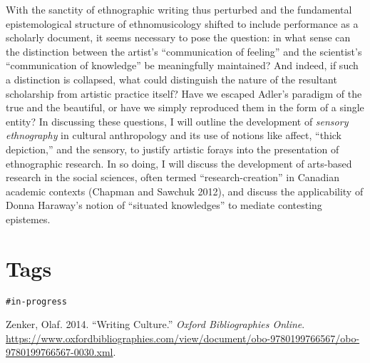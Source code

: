 With the sanctity of ethnographic writing thus perturbed and the
fundamental epistemological structure of ethnomusicology shifted to
include performance as a scholarly document, it seems necessary to pose
the question: in what sense can the distinction between the artist's
``communication of feeling'' and the scientist's ``communication of
knowledge'' be meaningfully maintained? And indeed, if such a
distinction is collapsed, what could distinguish the nature of the
resultant scholarship from artistic practice itself? Have we escaped
Adler's paradigm of the true and the beautiful, or have we simply
reproduced them in the form of a single entity? In discussing these
questions, I will outline the development of \emph{sensory ethnography}
in cultural anthropology and its use of notions like affect, ``thick
depiction,'' and the sensory, to justify artistic forays into the
presentation of ethnographic research. In so doing, I will discuss the
development of arts-based research in the social sciences, often termed
``research-creation'' in Canadian academic contexts (Chapman and Sawchuk
2012), and discuss the applicability of Donna Haraway's notion of
``situated knowledges'' to mediate contesting epistemes.

\hypertarget{tags}{%
\section{Tags}\label{tags}}

\texttt{\#in-progress}

\hypertarget{refs}{}
\begin{cslreferences}
\leavevmode\hypertarget{ref-zenker_writing_2014}{}%
Zenker, Olaf. 2014. ``Writing Culture.'' \emph{Oxford Bibliographies
Online}.
\url{https://www.oxfordbibliographies.com/view/document/obo-9780199766567/obo-9780199766567-0030.xml}.
\end{cslreferences}
